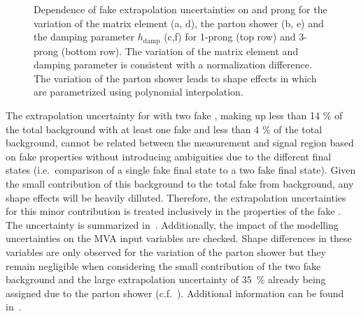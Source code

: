 \begin{figure}[htbp]
  \centering


  \caption{Dependence of fake \tauhad extrapolation uncertainties on
    \tauhad \pT and prong for the variation of the matrix element (a,
    d), the parton shower (b, e) and the damping parameter
    $h_\text{damp}$ (c,f) for 1-prong \tauhad (top row) and 3-prong
    \tauhad (bottom row). The variation of the matrix element and
    damping parameter is consistent with a normalization
    difference. The variation of the parton shower leads to shape
    effects in \tauhad \pT which are parametrized using polynomial
    interpolation.}
  \label{fig:ttbar_fake_sf_extrapol_psshape}
\end{figure}

The extrapolation uncertainty for \ttbar with two fake \tauhad, making
up less than 14 \% of the total \ttbar background with at least one
fake \tauhad and less than 4 \% of the total background, cannot be
related between the measurement and signal region based on fake
\tauhad properties without introducing ambiguities due to the
different final states (i.e.\ comparison of a single fake \tauhad
final state to a two fake \tauhad final state). Given the small
contribution of this background to the total fake \tauhad from \ttbar
background, any shape effects will be heavily dilluted. Therefore, the
extrapolation uncertainties for this minor contribution is treated
inclusively in the properties of the fake \tauhad. The uncertainty is
summarized in~. Additionally, the
impact of the \ttbar modelling uncertainties on the MVA input
variables are checked. Shape differences in these variables are only
observed for the variation of the parton shower but they remain
negligible when considering the small contribution of the two fake
\tauhad background and the large extrapolation uncertainty of
\SI{35}{\percent} already being assigned due to the parton shower
(c.f.~). Additional information
can be found in~.

